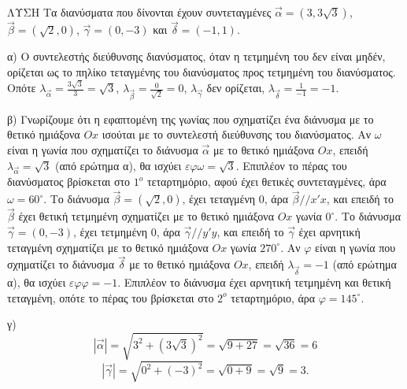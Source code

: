 ΛΥΣΗ
Τα διανύσματα που δίνονται έχουν συντεταγμένες $\vec{\alpha}=(3, 3\sqrt{3})$, $\vec{\beta}=(\sqrt{2}, 0)$, $\vec{\gamma}=(0, -3)$ και $\vec{\delta}=(-1, 1)$.

\noindent
α) Ο συντελεστής διεύθυνσης διανύσματος, όταν η τετμημένη του δεν είναι μηδέν, ορίζεται ως το πηλίκο τεταγμένης του διανύσματος προς τετμημένη του διανύσματος. Οπότε
$\lambda_{\vec{\alpha}} = \frac{3\sqrt{3}}{3} = \sqrt{3}$, $\lambda_{\vec{\beta}} = \frac{0}{\sqrt{2}} = 0$, $\lambda_{\vec{\gamma}}$ δεν ορίζεται, $\lambda_{\vec{\delta}} = \frac{1}{-1} = -1$.

\noindent
β) Γνωρίζουμε ότι η εφαπτομένη της γωνίας που σχηματίζει ένα διάνυσμα με το θετικό ημιάξονα $Ox$ ισούται με το συντελεστή διεύθυνσης του διανύσματος.
Αν $\omega$ είναι η γωνία που σχηματίζει το διάνυσμα $\vec{\alpha}$ με το θετικό ημιάξονα $Ox$, επειδή $\lambda_{\vec{\alpha}} = \sqrt{3}$ (από ερώτημα α), θα ισχύει $\varepsilon\varphi\omega = \sqrt{3}$. Επιπλέον το πέρας του διανύσματος βρίσκεται στο $1^ο$ τεταρτημόριο, αφού έχει θετικές συντεταγμένες, άρα $\omega = 60^\circ$.
Το διάνυσμα $\vec{\beta} = (\sqrt{2}, 0)$, έχει τεταγμένη $0$, άρα $\vec{\beta} // x'x$, και επειδή το $\vec{\beta}$ έχει θετική τετμημένη σχηματίζει με το θετικό ημιάξονα $Ox$ γωνία $0^\circ$.
Το διάνυσμα $\vec{\gamma} = (0, -3)$, έχει τετμημένη $0$, άρα $\vec{\gamma} // y'y$, και επειδή το $\vec{\gamma}$ έχει αρνητική τεταγμένη σχηματίζει με το θετικό ημιάξονα $Ox$ γωνία $270^\circ$.
Αν $\varphi$ είναι η γωνία που σχηματίζει το διάνυσμα $\vec{\delta}$ με το θετικό ημιάξονα $Ox$, επειδή $\lambda_{\vec{\delta}} = -1$ (από ερώτημα α), θα ισχύει $\varepsilon\varphi\varphi = -1$. Επιπλέον το διάνυσμα έχει αρνητική τετμημένη και θετική τεταγμένη, οπότε το πέρας του βρίσκεται στο $2^ο$ τεταρτημόριο, άρα $\varphi = 145^\circ$.

\noindent
γ)
\[
|\vec{\alpha}| = \sqrt{3^2 + (3\sqrt{3})^2} = \sqrt{9 + 27} = \sqrt{36} = 6
\]
\[
|\vec{\gamma}| = \sqrt{0^2 + (-3)^2} = \sqrt{0 + 9} = \sqrt{9} = 3.
\]
\endlysh